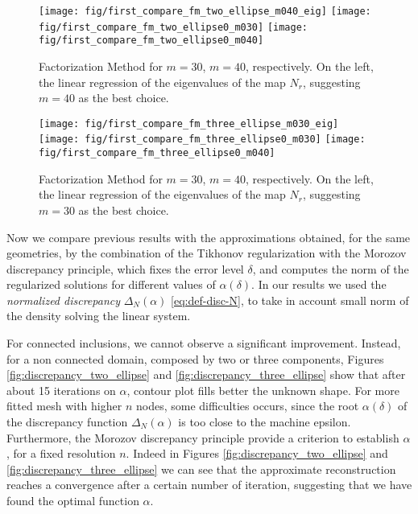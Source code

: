 \documentclass[10pt, a4paper, twoside, openright]{book}
\theoremstyle{definition}
\theoremstyle{plain}
\theoremstyle{plain}
\theoremstyle{plain}
\theoremstyle{plain}
\theoremstyle{plain}
\theoremstyle{plain}
\theoremstyle{plain}
\theoremstyle{plain}
\begin{document}
\begin{center}
\begin{figure}[]
{
\texttt{[image: fig/first\_compare\_fm\_two\_ellipse\_m040\_eig]}
}
{
\texttt{[image: fig/first\_compare\_fm\_two\_ellipse0\_m030]}
}
{
\texttt{[image: fig/first\_compare\_fm\_two\_ellipse0\_m040]}
}
\caption{Factorization Method for $m=30$, $m=40$, respectively. On the left, the linear regression of the
eigenvalues of the map $N_r$, suggesting $m=40$ as the best choice.}
\label{fig:first_compare_two_ellipse}
\end{figure}
\end{center}
\begin{center}
\begin{figure}[]
{
\texttt{[image: fig/first\_compare\_fm\_three\_ellipse\_m030\_eig]}
}
{
\texttt{[image: fig/first\_compare\_fm\_three\_ellipse0\_m030]}
}
{
\texttt{[image: fig/first\_compare\_fm\_three\_ellipse0\_m040]}
}
\caption{Factorization Method for $m=30$, $m=40$, respectively. On the left, the linear regression of the
eigenvalues of the map $N_r$, suggesting $m=30$ as the best choice.}
\label{fig:first_compare_three_ellipse}
\end{figure}
\end{center}


\par
Now we compare previous results with the approximations obtained, for the same geometries, by the 
combination of the Tikhonov regularization with the Morozov discrepancy principle, which fixes the 
error level $\delta$, and computes the norm of the regularized solutions for different values of 
$\alpha(\delta)$. In our results we used the \emph{normalized discrepancy} $\Delta_N(\alpha)$ 
\eqref{eq:def-disc-N}, to take in account small norm of the density solving the linear system.
\par
For connected inclusions, we cannot observe a significant improvement. 
Instead, for a non connected domain, composed by two or three components, Figures \ref{fig:discrepancy_two_ellipse} 
and \ref{fig:discrepancy_three_ellipse}
show that after about 15 iterations on $\alpha$, contour plot fills better the unknown shape.
For more fitted mesh with higher $n$ nodes, 
some difficulties occurs, since the root $\alpha(\delta)$ of the discrepancy 
function $\Delta_N(\alpha)$ is too close to the machine epsilon. 
Furthermore, the Morozov discrepancy principle provide a criterion to establish 
$\alpha$, for a fixed resolution $n$. Indeed in Figures \ref{fig:discrepancy_two_ellipse} 
and \ref{fig:discrepancy_three_ellipse} we can see that the approximate reconstruction
reaches a convergence after a certain number of iteration, suggesting that we have
found the optimal function $\alpha$.
\end{document}
